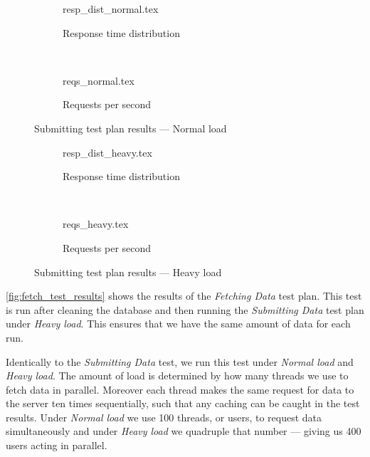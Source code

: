 \begin{figure}[!htb]
    \centering
    \begin{subfigure}[b]{\textwidth}
        \footnotesize
        \centering
        {resp_dist_normal.tex}
        \caption{Response time distribution}\label{fig:submit_resp_t_dist_normal}
    \end{subfigure}\\
    \begin{subfigure}[b]{\textwidth}
        \footnotesize
        \centering
        {reqs_normal.tex}
        \caption{Requests per second}\label{fig:submit_reqs_p_sec_normal}
    \end{subfigure}
    \caption{Submitting test plan results --- Normal load}\label{fig:submit_test_results_normal}
\end{figure}
\begin{figure}[!htb]
    \begin{subfigure}[b]{\textwidth}
        \footnotesize
        \centering
        {resp_dist_heavy.tex}
        \caption{Response time distribution}\label{fig:submit_resp_t_dist_heavy}
    \end{subfigure}\\
    \begin{subfigure}[b]{\textwidth}
        \footnotesize
        \centering
        {reqs_heavy.tex}
        \caption{Requests per second}\label{fig:submit_reqs_p_sec_heavy}
    \end{subfigure}
    \caption{Submitting test plan results --- Heavy load}\label{fig:submit_test_results_heavy}
\end{figure}

\bigskip
\cref{fig:fetch_test_results} shows the results of the \textit{Fetching Data} test plan.
This test is run after cleaning the database and then running the \textit{Submitting Data} test plan under \textit{Heavy load}.
This ensures that we have the same amount of data for each run.

Identically to the \textit{Submitting Data} test, we run this test under \textit{Normal load} and \textit{Heavy load}.
The amount of load is determined by how many threads we use to fetch data in parallel.
Moreover each thread makes the same request for data to the server ten times sequentially, such that any caching can be caught in the test results.
Under \textit{Normal load} we use 100 threads, or users, to request data simultaneously and under \textit{Heavy load} we quadruple that number --- giving us 400 users acting in parallel.


